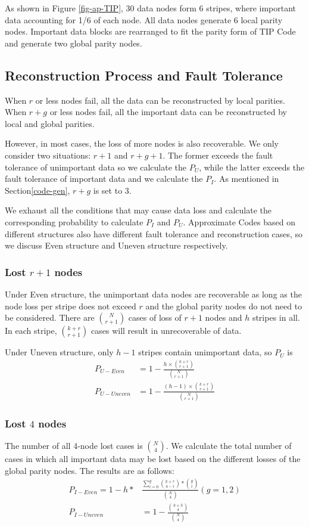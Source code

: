 \documentclass[sigconf]{acmart}
\begin{document}
As shown in Figure \ref{fig-ap-TIP}, 30 data nodes form 6 stripes, where important data accounting for 1/6 of each node.
All data nodes generate 6 local parity nodes.
Important data blocks are rearranged to fit the parity form of TIP Code and generate two global parity nodes.

\subsection{Reconstruction Process and Fault Tolerance}\label{ReconstructionFT}
When $r$ or less nodes fail, all the data can be reconstructed by local parities.
When $r+g$ or less nodes fail, all the important data can be reconstructed by local and global parities.

However, in most cases, the loss of more nodes is also recoverable. We only consider two situations: $r+1$ and $r+g+1$.
The former exceeds the fault tolerance of unimportant data so we calculate the $P_{U}$, while the latter exceeds the fault tolerance of important data and we calculate the $P_{I}$.
As mentioned in Section\ref{code-gen}, $r+g$ is set to 3.

We exhaust all the conditions that may cause data loss and calculate the corresponding probability to calculate $P_{I}$ and $P_{U}$.
Approximate Codes based on different structures also have different fault tolerance and reconstruction cases, so we discuss Even structure and Uneven structure respectively.

\subsubsection{Lost $r+1$ nodes}
Under Even structure, the unimportant data nodes are recoverable as long as the node loss per stripe does not exceed $r$ and the global parity nodes do not need to be considered.
There are $\binom{N}{r+1}$ cases of loss of $r+1$ nodes and $h$ stripes in all. In each stripe, $\binom{k+r}{r+1}$ cases will result in unrecoverable of data.

Under Uneven structure, only $h-1$ stripes contain unimportant data, so $P_{U}$ is
\begin{align}
    P_{U-Even} &= 1 - \frac{h \times \binom{k+r}{r+1}}{\binom{N}{r+1}}\\
    P_{U-Uneven} &= 1 - \frac{(h-1) \times \binom{k+r}{r+1}}{\binom{N}{r+1}}
\end{align}

\subsubsection{Lost $4$ nodes}
The number of all 4-node lost cases is $\binom{N}{4}$.
We calculate the total number of cases in which all important data may be lost based on the different losses of the global parity nodes. The results are as follows:
\begin{align}
    P_{I-Even} = 1 - h*&\frac{\sum_{i=0}^{g} {\binom{k+r}{4-i}*\binom{g}{i}} }{\binom{N}{4}}  (g=1,2)\\
    P_{I-Uneven} &= 1 - \frac{\binom{k+3}{4}}{\binom{N}{4}}
\end{align}
\end{document}
